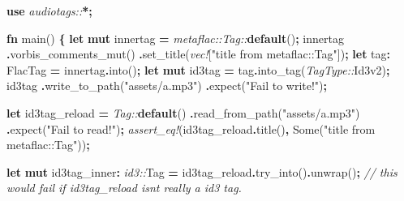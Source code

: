 \documentclass[
]{book}
\newenvironment{Shaded}{\begin{snugshade}}{\end{snugshade}}
\newcommand{\CommentTok}[1]{\textcolor[rgb]{0.56,0.35,0.01}{\textit{#1}}}
\newcommand{\ConstantTok}[1]{\textcolor[rgb]{0.00,0.00,0.00}{#1}}
\newcommand{\KeywordTok}[1]{\textcolor[rgb]{0.13,0.29,0.53}{\textbf{#1}}}
\newcommand{\NormalTok}[1]{#1}
\newcommand{\OperatorTok}[1]{\textcolor[rgb]{0.81,0.36,0.00}{\textbf{#1}}}
\newcommand{\PreprocessorTok}[1]{\textcolor[rgb]{0.56,0.35,0.01}{\textit{#1}}}
\newcommand{\StringTok}[1]{\textcolor[rgb]{0.31,0.60,0.02}{#1}}
\begin{document}
\begin{Shaded}
\begin{Highlighting}[]
\KeywordTok{use} \PreprocessorTok{audiotags::}\OperatorTok{*;}

\KeywordTok{fn}\NormalTok{ main() }\OperatorTok{\{}
    \KeywordTok{let} \KeywordTok{mut}\NormalTok{ innertag }\OperatorTok{=} \PreprocessorTok{metaflac::Tag::}\KeywordTok{default}\NormalTok{()}\OperatorTok{;}
\NormalTok{    innertag}
        \OperatorTok{.}\NormalTok{vorbis\_comments\_mut()}
        \OperatorTok{.}\NormalTok{set\_title(}\PreprocessorTok{vec!}\NormalTok{[}\StringTok{"title from metaflac::Tag"}\NormalTok{])}\OperatorTok{;}
    \KeywordTok{let}\NormalTok{ tag}\OperatorTok{:}\NormalTok{ FlacTag }\OperatorTok{=}\NormalTok{ innertag}\OperatorTok{.}\NormalTok{into()}\OperatorTok{;}
    \KeywordTok{let} \KeywordTok{mut}\NormalTok{ id3tag }\OperatorTok{=}\NormalTok{ tag}\OperatorTok{.}\NormalTok{into\_tag(}\PreprocessorTok{TagType::}\NormalTok{Id3v2)}\OperatorTok{;}
\NormalTok{    id3tag}
        \OperatorTok{.}\NormalTok{write\_to\_path(}\StringTok{"assets/a.mp3"}\NormalTok{)}
        \OperatorTok{.}\NormalTok{expect(}\StringTok{"Fail to write!"}\NormalTok{)}\OperatorTok{;}

    \KeywordTok{let}\NormalTok{ id3tag\_reload }\OperatorTok{=} \PreprocessorTok{Tag::}\KeywordTok{default}\NormalTok{()}
        \OperatorTok{.}\NormalTok{read\_from\_path(}\StringTok{"assets/a.mp3"}\NormalTok{)}
        \OperatorTok{.}\NormalTok{expect(}\StringTok{"Fail to read!"}\NormalTok{)}\OperatorTok{;}
    \PreprocessorTok{assert\_eq!}\NormalTok{(id3tag\_reload}\OperatorTok{.}\NormalTok{title()}\OperatorTok{,} \ConstantTok{Some}\NormalTok{(}\StringTok{"title from metaflac::Tag"}\NormalTok{))}\OperatorTok{;}

    \KeywordTok{let} \KeywordTok{mut}\NormalTok{ id3tag\_inner}\OperatorTok{:} \PreprocessorTok{id3::}\NormalTok{Tag }\OperatorTok{=}\NormalTok{ id3tag\_reload}\OperatorTok{.}\NormalTok{try\_into()}\OperatorTok{.}\NormalTok{unwrap()}\OperatorTok{;}
    \CommentTok{// this would fail if \textasciigrave{}id3tag\_reload\textasciigrave{} isn\textquotesingle{}t really a id3 tag.}


\end{Highlighting}
\end{Shaded}
\end{document}
